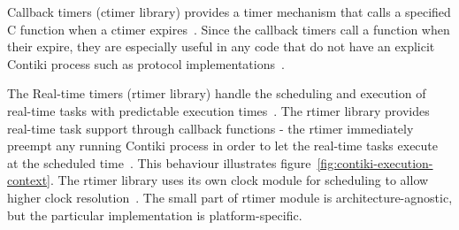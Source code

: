 Callback timers (ctimer library) provides a timer mechanism that calls a specified
C function when a ctimer expires~\cite{contiki-docs}.
Since the callback timers call a function when their expire,
they are especially useful in any code that do not have an
explicit Contiki process such as protocol implementations~\cite{contiki-wiki-timers}.

The Real-time timers (rtimer library) handle the scheduling and execution of
real-time tasks with predictable execution times~\cite{contiki-docs}.
The rtimer library provides real-time task support through callback functions -
the rtimer immediately preempt any running Contiki process in order to let the real-time tasks
execute at the scheduled time~\cite{contiki-wiki-timers}.
This behaviour illustrates figure~\ref{fig:contiki-execution-context}.
The rtimer library uses its own clock module for scheduling
to allow higher clock resolution~\cite{contiki-wiki-timers}.
The small part of rtimer module is architecture-agnostic,
but the particular implementation is platform-specific.

